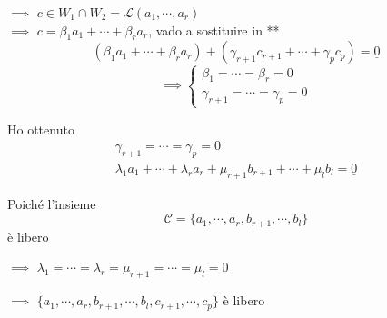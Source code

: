 {\begin{enumerate}
    $\implies$ $c \in W_1 \cap W_2 = \mathscr{L}(a_1,\cdots, a_r)$ \\
    
    $\implies$ $c = \beta_1 a_1 +\cdots+\beta_r a_r$, vado a sostituire in **
    \[(\beta_1 a_1 +\cdots+\beta_r a_r)+(\gamma_{r+1} c_{r+1} + \cdots + \gamma_p c_p) = \underline{0}\]
    \[\implies \begin{cases}
    	\beta_1=\cdots=\beta_r=0\\
    	\gamma_{r+1}=\cdots=\gamma_p=0
    \end{cases}\]	%

    Ho ottenuto
    \begin{gather*}
    \gamma_{r+1}=\cdots=\gamma_p=0\\
    \lambda_1a_1+ \cdots + \lambda_r a_r + \mu_{r+1} b_{r+1} + \cdots + \mu_l b_l=\underline{0}
    \end{gather*}
     
    Poiché l'insieme \[\mathscr{C}=\{a_1, \cdots, a_r, b_{r+1}, \cdots, b_l\}\] è libero
    
    $\implies$ $\lambda_1=\cdots=\lambda_r = \mu_{r+1}=\cdots=\mu_l=0$
    
    $\implies$ $\{a_1, \cdots, a_r, b_{r+1}, \cdots, b_l, c_{r+1}, \cdots, c_p\}$ è libero
\end{enumerate}}

